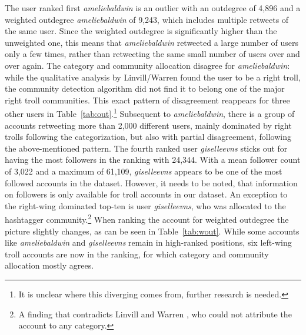 \documentclass[12pt, titlepage=true, toc=bib]{scrartcl}
\begin{document}
The user ranked first \textit{ameliebaldwin} is an outlier with an outdegree of 4,896 and a weighted outdegree \textit{ameliebaldwin} of 9,243, which includes multiple retweets of the same user. Since the weighted outdegree is significantly higher than the unweighted one, this means that \textit{ameliebaldwin} retweeted a large number of users only a few times, rather than retweeting the same small number of users over and over again. The category and community allocation disagree for \textit{ameliebaldwin}: while the qualitative analysis by Linvill/Warren found the user to be a right troll, the community detection algorithm did not find it to belong one of the major right troll communities. This exact pattern of disagreement reappears for three other users in Table~\ref{tab:out}.\footnote{It is unclear where this diverging comes from, further research is needed.} Subsequent to \textit{ameliebaldwin}, there is a group of accounts retweeting more than 2,000 different users, mainly dominated by right trolls following the categorization, but also with partial disagreement, following the above-mentioned pattern. The fourth ranked user \textit{giselleevns} sticks out for having the most followers in the ranking with 24,344. With a mean follower count of 3,022 and a maximum of 61,109, \textit{giselleevns} appears to be one of the most followed accounts in the dataset. However, it needs to be noted, that information on followers is only available for troll accounts in our dataset. An exception to the right-wing dominated top-ten is user \textit{giselleevns}, who was allocated to the hashtagger community.\footnote{A finding that contradicts Linvill and Warren \cite*{linvill_troll_2018}, who could not attribute the account to any category.} When ranking the account for weighted outdegree the picture slightly changes, as can be seen in Table~\ref{tab:wout}. While some accounts like \textit{ameliebaldwin} and \textit{giselleevns} remain in high-ranked positions, six left-wing troll accounts are now in the ranking, for which category and community allocation mostly agrees.
\end{document}
